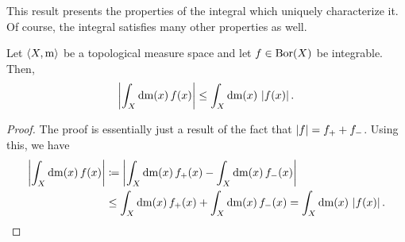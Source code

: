 This result presents the properties of the integral which uniquely characterize it.  Of course, the integral satisfies many other properties as well.
\begin{prp}\label{TriangleInequality}
Let $\langle X,\mathrm{m}\rangle$ be a topological measure space and let $f\in \operatorname{Bor} (X)$ be integrable.  Then,
\begin{equation}
\left| \int _X\mathop{}\!\mathrm{d} \mathrm{m} (x)\, f(x)\right| \leq \int _X\mathop{}\!\mathrm{d} \mathrm{m} (x)\, \left| f(x)\right| .
\end{equation}
\begin{proof}
The proof is essentially just a result of the fact that $\lvert f\rvert=f_++f_-$.  Using this, we have
\begin{equation}
\begin{split}
\left| \int _X\mathop{}\!\mathrm{d} \mathrm{m} (x)\, f(x)\right| & \coloneqq \left| \int _X\mathop{}\!\mathrm{d} \mathrm{m} (x)\, f_+(x)-\int _X\mathop{}\!\mathrm{d} \mathrm{m} (x)\, f_-(x)\right| \\
& \leq \int _X\mathop{}\!\mathrm{d} \mathrm{m} (x)\, f_+(x)+\int _X\mathop{}\!\mathrm{d} \mathrm{m} (x)\, f_-(x)=\int _X\mathop{}\!\mathrm{d} \mathrm{m} (x)\, \left| f(x)\right| .
\end{split}
\end{equation}
\end{proof}
\end{prp}

